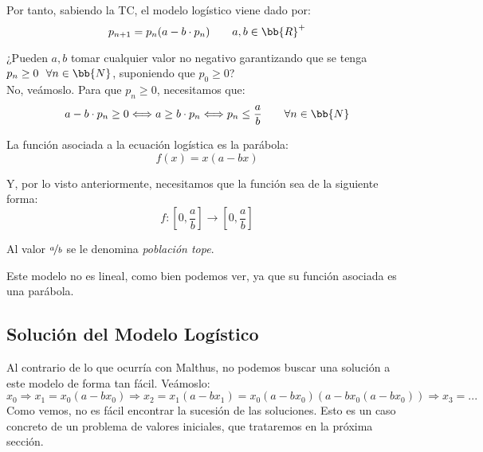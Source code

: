 \begin{comment}
Buscamos:
\begin{align*}
    f_n &= \alpha + \beta p_n\\
    m_n &= \gamma + \psi p_n
\end{align*}
Con $\alpha, \beta, \gamma, \psi \in \bb{R}^+$.
\end{comment}

Por tanto, sabiendo la TC, el modelo logístico viene dado por:
\begin{equation*}
    p_{n+1} = p_n (a-b \cdot p_n) \qquad a,b\in \bb{R}^+
\end{equation*}

\begin{observacion}
    ¿Pueden $a,b$ tomar cualquier valor no negativo garantizando que se tenga $p_n \geq 0~~\forall n\in \bb{N}$, suponiendo que $p_0 \geq 0$?\\

    No, veámoslo.
    Para que $p_n\geq 0$, necesitamos que:
    \begin{equation*}
        a-b\cdot p_n \geq 0 \Longleftrightarrow
        a \geq b\cdot p_n
        \Longleftrightarrow
        p_n \leq \frac{a}{b} \qquad \forall n\in \bb{N}
    \end{equation*}

    La función asociada a la ecuación logística es la parábola:
    $$f(x) = x(a-bx)$$
    
    Y, por lo visto anteriormente, necesitamos que la función sea de la siguiente forma: $$f:\left[0, \dfrac{a}{b}\right] \to \left[0, \dfrac{a}{b}\right]$$

    Al valor $\nicefrac{a}{b}$ se le denomina \emph{población tope}.
\end{observacion}

Este modelo no es lineal, como bien podemos ver, ya que su función asociada es una parábola.


\subsection{Solución del Modelo Logístico}

Al contrario de lo que ocurría con Malthus, no podemos buscar una solución a este modelo de forma tan fácil. Veámoslo:
$$x_0 \Rightarrow x_1 = x_0 (a-bx_0) \Rightarrow x_2 = x_1 (a-bx_1) = x_0(a-bx_0)(a-bx_0(a-bx_0))\Rightarrow x_3=...$$
Como vemos, no es fácil encontrar la sucesión de las soluciones. Esto es un caso concreto de un problema de valores iniciales,
que trataremos en la próxima sección.

